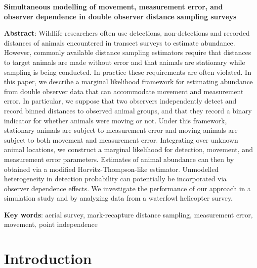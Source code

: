 \documentclass[12pt,fleqn]{article}
\begin{document}
\doublespacing

\textbf{Simultaneous modelling of movement, measurement error, and observer dependence in double observer distance sampling surveys}

\linenumbers

\bigskip

\textbf{Abstract}: Wildlife researchers often use detections, non-detections and recorded distances of animals encountered in transect surveys to estimate abundance. However, commonly available distance sampling estimators require that distances to target animals are made without error and that animals are stationary while sampling is being conducted.  In practice these requirements are often violated. In this paper, we describe a marginal likelihood framework for estimating abundance from double observer data that can accommodate movement and measurement error.  In particular, we suppose that two observers independently detect and record binned distances to observed animal groups, and that they record a binary indicator for whether animals were moving or not.  Under this framework, stationary animals are subject to measurement error and moving animals are subject to both movement and measurement error.  Integrating over unknown animal locations, we construct a marginal likelihood for detection, movement, and measurement error parameters. Estimates of animal abundance can then by obtained via a modified Horvitz-Thompson-like estimator.  Unmodelled heterogeneity in detection probability can potentially be incorporated via observer dependence effects.  We investigate the performance of our approach in a simulation study and by analyzing data from a waterfowl helicopter survey.


\textbf{Key words}: aerial survey, mark-recapture distance sampling, measurement error, movement, point independence



\def\VAR{{\rm Var}\,}
\def\COV{{\rm Cov}\,}
\def\Prob{{\rm P}\,}
\def\bfX{\bf X}
\def\bfbeta{\boldsymbol{\beta}}
\def\bfdelta{\boldsymbol{\delta}}
\def\bfeta{\boldsymbol{\eta}}
\def\bfphi{\pmb{\phi}}
\def\bftheta{\pmb{\theta}}
\def\bfpsi{\pmb{\psi}}
\def\bfPsi{\pmb{\Psi}}
\def\bfpi{\pmb{\pi}}
\def\bfp{{\bf p}}
\def\bfGamma{\pmb{\Gamma}}




\section{Introduction}
\end{document}
